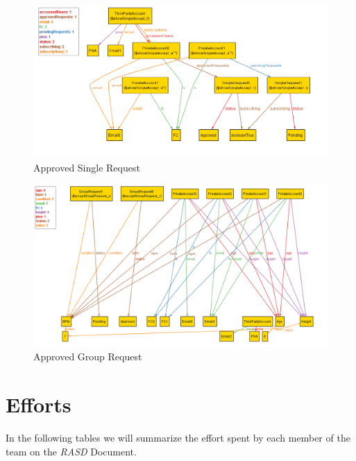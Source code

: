 \documentclass[titlepage]{article}
\begin{document}
		\begin{figure}[H]
			\center
  			\includegraphics[width=\textwidth]{Alloy/singleRequest.png}
			\caption{Approved Single Request}
			\label{fig:sing}
		\end{figure}

		\begin{figure}[H]
			\center
  			\includegraphics[width=\textwidth]{Alloy/groupRequest.png}
			\caption{Approved Group Request}
			\label{fig:groupg}
		\end{figure}

	\section{Efforts}
	In the following tables we will summarize the effort spent by each member of the team on the {\it RASD} Document.
		
\end{document}
